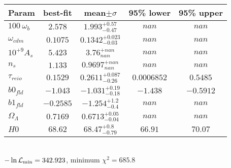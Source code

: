 \begin{tabular}{|l|c|c|c|c|} 
 \hline 
Param & best-fit & mean$\pm\sigma$ & 95\% lower & 95\% upper \\ \hline 
$100~\omega_{b }$ &$2.578$ & $1.993_{-0.47}^{+0.57}$ & $nan$ & $nan$ \\ 
$\omega_{cdm }$ &$0.1075$ & $0.1342_{-0.03}^{+0.023}$ & $nan$ & $nan$ \\ 
$10^{+9}A_{s }$ &$5.423$ & $3.76_{nan}^{+nan}$ & $nan$ & $nan$ \\ 
$n_{s }$ &$1.133$ & $0.9697_{nan}^{+nan}$ & $nan$ & $nan$ \\ 
$\tau_{reio }$ &$0.1529$ & $0.2611_{-0.26}^{+0.087}$ & $0.0006852$ & $0.5485$ \\ 
$b0_{fld }$ &$-1.043$ & $-1.031_{-0.18}^{+0.19}$ & $-1.438$ & $-0.5912$ \\ 
$b1_{fld }$ &$-0.2585$ & $-1.254_{-0.4}^{+1.2}$ & $nan$ & $nan$ \\ 
$\Omega_{\Lambda }$ &$0.7169$ & $0.6713_{-0.04}^{+0.05}$ & $nan$ & $nan$ \\ 
$H0$ &$68.62$ & $68.47_{-0.79}^{+0.8}$ & $66.91$ & $70.07$ \\ 
\hline 
 \end{tabular} \\ 
$-\ln{\cal L}_\mathrm{min} =342.923$, minimum $\chi^2=685.8$ \\ 
